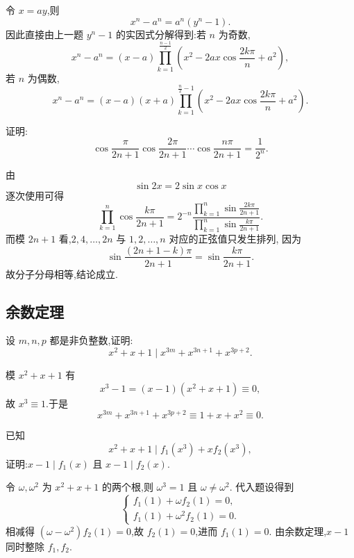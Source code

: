 \begin{solution}
令 $x=ay$,则
\[
  x^n-a^n=a^n(y^n-1).
\]
因此直接由上一题 $y^n-1$ 的实因式分解得到:若 $n$ 为奇数,
\[
  x^n-a^n=(x-a)
  \prod\limits_{k=1}^{\frac{n-1}{2}}
  \left(x^2-2ax\cos\dfrac{2k\pi}{n}+a^2\right),
\]
若 $n$ 为偶数,
\[
  x^n-a^n=(x-a)(x+a)
  \prod\limits_{k=1}^{\frac n2-1}
  \left(x^2-2ax\cos\dfrac{2k\pi}{n}+a^2\right).
\]
\end{solution}

\begin{example}
证明:
\[
  \cos\dfrac{\pi}{2n+1}
  \cos\dfrac{2\pi}{2n+1}\cdots
  \cos\dfrac{n\pi}{2n+1}
  =\dfrac{1}{2^n}.
\]
\end{example}
\exampleblank

\begin{solution}
由
\[
  \sin 2x=2\sin x\cos x
\]
逐次使用可得
\[
  \displaystyle\prod\limits_{k=1}^{n}\cos\dfrac{k\pi}{2n+1}
  =2^{-n}
  \dfrac{\displaystyle\prod_{k=1}^{n}\sin\frac{2k\pi}{2n+1}}
        {\displaystyle\prod_{k=1}^{n}\sin\frac{k\pi}{2n+1}}.
\]
而模 $2n+1$ 看,$2,4,\ldots,2n$ 与 $1,2,\ldots,n$ 对应的正弦值只发生排列,
因为
\[
  \sin\dfrac{(2n+1-k)\pi}{2n+1}
  =\sin\dfrac{k\pi}{2n+1}.
\]
故分子分母相等,结论成立.
\end{solution}

\subsection{余数定理}

\begin{example}
设 $m,n,p$ 都是非负整数,证明:
\[
  x^2+x+1\mid x^{3m}+x^{3n+1}+x^{3p+2}.
\]
\end{example}
\exampleblank

\begin{solution}
模 $x^2+x+1$ 有
\[
  x^3-1=(x-1)(x^2+x+1)\equiv0,
\]
故 $x^3\equiv1$.于是
\[
  x^{3m}+x^{3n+1}+x^{3p+2}
  \equiv1+x+x^2\equiv0.
\]
\end{solution}

\begin{example}
已知
\[
  x^2+x+1\mid f_1(x^3)+xf_2(x^3),
\]
证明:$x-1\mid f_1(x)$ 且 $x-1\mid f_2(x)$.
\end{example}
\exampleblank

\begin{solution}
令 $\omega,\omega^2$ 为 $x^2+x+1$ 的两个根,则 $\omega^3=1$ 且 $\omega\ne\omega^2$.
代入题设得到
\[
\begin{cases}
  f_1(1)+\omega f_2(1)=0,\\
  f_1(1)+\omega^2 f_2(1)=0.
\end{cases}
\]
相减得 $(\omega-\omega^2)f_2(1)=0$,故 $f_2(1)=0$,进而 $f_1(1)=0$.
由余数定理,$x-1$ 同时整除 $f_1,f_2$.
\end{solution}

